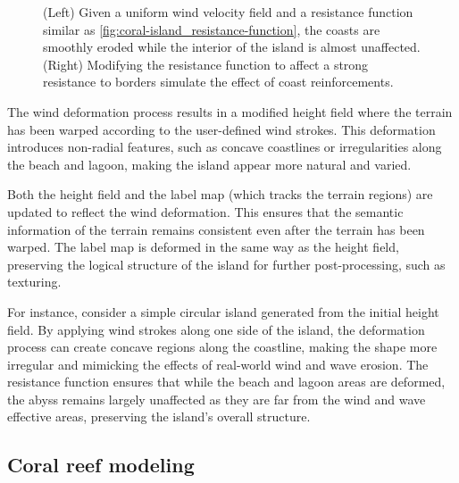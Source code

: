 \begin{figure}[H]
    \caption{(Left) Given a uniform wind velocity field and a resistance function similar as \cref{fig:coral-island_resistance-function}, the coasts are smoothly eroded while the interior of the island is almost unaffected. (Right) Modifying the resistance function to affect a strong resistance to borders simulate the effect of coast reinforcements.}
\end{figure}


The wind deformation process results in a modified height field where the terrain has been warped according to the user-defined wind strokes. This deformation introduces non-radial features, such as concave coastlines or irregularities along the beach and lagoon, making the island appear more natural and varied.

Both the height field and the label map (which tracks the terrain regions) are updated to reflect the wind deformation. This ensures that the semantic information of the terrain remains consistent even after the terrain has been warped. The label map is deformed in the same way as the height field, preserving the logical structure of the island for further post-processing, such as texturing.

For instance, consider a simple circular island generated from the initial height field. By applying wind strokes along one side of the island, the deformation process can create concave regions along the coastline, making the shape more irregular and mimicking the effects of real-world wind and wave erosion. The resistance function ensures that while the beach and lagoon areas are deformed, the abyss remains largely unaffected as they are far from the wind and wave effective areas, preserving the island's overall structure.




\subsection{Coral reef modeling}
\label{sec:coral-island_coral-reef}


